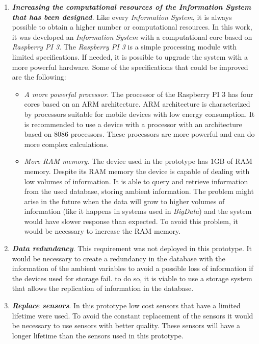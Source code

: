 \begin{enumerate}

\item \textbf{\textit{Increasing the computational resources of the \textit{Information System} that has been designed}}. Like every \textit{Information System}, it is always possible to obtain a higher number or computational resources. In this work, it was developed an \textit{Information System} with a computational core based on \textit{Raspberry PI 3}. The \textit{Raspberry PI 3} is a simple processing module with limited specifications. If needed, it is possible to upgrade the system with a more powerful hardware. Some of the specifications that could be improved are the following:\\

\begin{itemize}

\item \textit{A more powerful processor}. The processor of the Raspberry PI 3 has four cores based on an ARM architecture. ARM architecture is characterized by processors suitable for mobile devices with low energy consumption. It is recommended to use a device with a processor with an architecture based on 8086 processors. These processors are more powerful and can do more complex calculations.

\item \textit{More RAM memory}. The device used in the prototype has 1GB of RAM memory. Despite its RAM memory the device is capable of dealing with low volumes of information. It is able to query and retrieve information from the used database, storing ambient information. The problem might arise in the future when the data will grow to higher volumes of information (like it happens in systems used in \textit{BigData}) and the system would have slower response than expected. To avoid this problem, it would be necessary to increase the RAM memory.

\end{itemize}

\item \textbf{\textit{Data redundancy}}. This requirement was not deployed in this prototype. It would be necessary to create a redundancy in the database with the information of the ambient variables to avoid a possible loss of information if the devices used for storage fail. to do so, it is viable to use a storage system that allows the replication of information in the database.

\item \textbf{\textit{Replace sensors}}. In this prototype low cost sensors that have a limited lifetime were used. To avoid the constant replacement of the sensors it would be necessary to use sensors with better quality. These sensors will have a longer lifetime than the sensors used in this prototype.


\end{enumerate}

